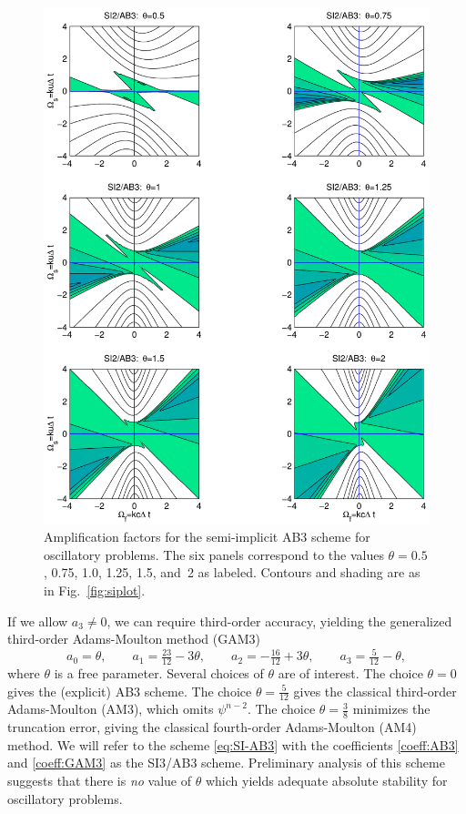 \documentclass[12pt]{article}
\newcommand{\mycaption}[1]{\Mycaption{5.5in}{#1}}
\newcommand{\Mycaption}[2]{\parbox[t]{#1}{\caption{#2}}}
\begin{document}
\begin{figure}[hbp]
\begin{center}
\includegraphics[width=5.5in,clip]{si2ab3}
\mycaption{\label{fig:si2ab3}
Amplification factors for the semi-implicit AB3 scheme for oscillatory 
problems.  
The six panels correspond to the values $\theta=0.5$, 0.75, 1.0, 1.25, 1.5,
and~2 as labeled.  Contours and shading are as in Fig.~\ref{fig:siplot}.}
\end{center}
\end{figure}

If we allow $a_3\ne0$, we can require third-order accuracy, 
yielding the generalized third-order Adams-Moulton method (GAM3)
\begin{equation}
a_0 =  \theta,
\qquad
a_1 =  \tfrac{23}{12} - 3\theta,
\qquad
a_2 = -\tfrac{16}{12} + 3\theta,
\qquad
a_3 =  \tfrac{5}{12} - \theta,
\label{coeff:GAM3}
\end{equation}
where $\theta$ is a free parameter.  Several choices of $\theta$ are of
interest.  The choice $\theta=0$ gives the (explicit) AB3 scheme.  The choice
$\theta=\tfrac{5}{12}$ gives the classical third-order Adams-Moulton (AM3),
which omits $\psi^{n-2}$.  The choice $\theta=\tfrac{3}{8}$ minimizes the
truncation error, giving the classical fourth-order Adams-Moulton (AM4)
method.  We will refer to the scheme \eqref{eq:SI-AB3} with the coefficients
\eqref{coeff:AB3} and \eqref{coeff:GAM3} as the SI3/AB3 scheme.  Preliminary
analysis of this scheme suggests that there is \emph{no} value of $\theta$
which yields adequate absolute stability for oscillatory problems.
\end{document}
